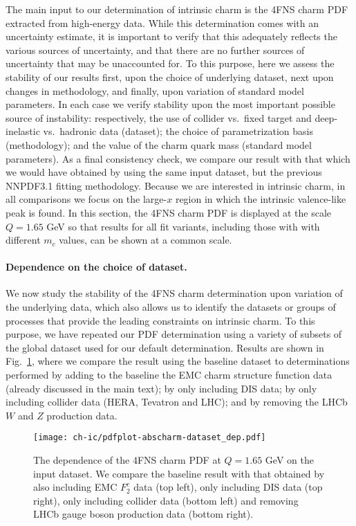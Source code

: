 The main input to our determination of intrinsic charm is the 4FNS
charm PDF extracted from high-energy data. While this
determination comes with an uncertainty estimate, it is important to
verify that this adequately reflects the various sources
of uncertainty, and that there are no further sources of uncertainty
that may be unaccounted for.
%
To this purpose, here we assess the
stability of our results first, upon the choice of underlying dataset,
next upon changes in methodology, and finally, upon variation of
standard model parameters.
%
In each case we verify stability upon the
most important possible source of instability: respectively, the use
of collider vs.\ fixed target and deep-inelastic vs.\ hadronic data
(dataset); the choice of parametrization basis (methodology); and the
value of the charm quark mass (standard model parameters).
%
As a final consistency check, we compare our result with that which we
would have obtained by using the same input dataset, but the previous
NNPDF3.1 fitting methodology.
%
Because we
are interested in intrinsic charm, in all comparisons we focus on
the large-$x$ region in which the intrinsic valence-like peak is found.
%
In this section, the 4FNS
charm PDF is displayed at the scale $Q = 1.65$ GeV so that
results for all fit variants, including
those with with different $m_c$ values, can be shown at a common scale.

\paragraph{Dependence on the choice of dataset.}
%
We now study the stability of the  4FNS charm determination upon
variation of the
underlying data, which also allows us to
identify the datasets or groups of processes that provide
the leading constraints on intrinsic charm.
%
To this purpose, we have repeated our PDF
determination using a  variety of subsets of the global dataset used for
our default determination. Results are shown in
Fig.~\ref{fig:ic/charm_dataset_dep}, where we compare the result using
the 
baseline dataset to determinations performed by adding to the baseline
the  EMC charm
structure function data (already discussed in the main text); by only
including  DIS data; by only including collider data (HERA,
Tevatron and LHC); and by removing the LHCb  $W$ and $Z$ production data.

\begin{figure}[t!]
  \begin{center}
    \texttt{[image: ch-ic/pdfplot-abscharm-dataset\_dep.pdf]}
    \caption{\small The dependence of the 4FNS charm PDF at $Q=1.65$ GeV on
      the input dataset.
      We compare the
    baseline result with that obtained by also including 
      EMC $F_2^c$ data (top left), only including DIS data (top
    right), only including collider data (bottom left) and removing
    LHCb gauge boson production data (bottom right). 
  \label{fig:ic/charm_dataset_dep} }
\end{center}
\end{figure}

